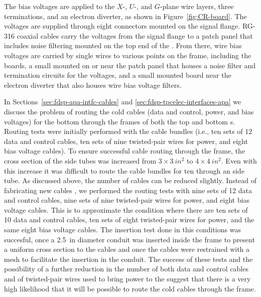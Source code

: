 The bias voltages are applied to the $X$-, $U$-, and $G$-plane 
wire layers, three  terminations, and an electron diverter, 
as shown in Figure~\ref{fig:CR-board}. The voltages are supplied 
through eight  connectors mounted on the signal flange. 
RG-316 coaxial cables carry the voltages from the signal flange to 
a patch panel  that includes noise filtering mounted on the top 
end of the . From there, wire bias voltages are carried by single wires to 
various points on the  frame, including the  
boards, a small  mounted on or near the patch panel that 
houses a noise filter and termination circuits for the   
voltages, and a small mounted board near the electron diverter 
that also houses wire bias voltage filters.

In Sections~\ref{sec:fdsp-apa-intfc-cables} and \ref{sec:fdsp-tpcelec-interfaces-apa}
we discuss the problem of routing the cold cables (data and control, power, and 
bias voltages) for the bottom  through the frames of both
the top and bottom s. Routing tests were initially performed
with the  cable bundles (i.e., ten sets of 12 data and
control cables, ten sets of nine twisted-pair wires for power, and eight bias voltage
cables). To ensure successful cable routing %
through the
 frame, the cross section of the side tubes was %
increased from %
$\num{3}\times\SI{3}{in^2}$ %
to $\num{4}\times\SI{4}{in^2}$. Even with %
this increase it was difficult to route the cable bundles for
ten  through an  side tube. As discussed
above, the number of cables can be reduced slightly. 
  Instead of
fabricating new cables , we performed the routing tests with
nine sets of 12 data and control cables, nine sets of nine 
twisted-pair wires for power, and eight bias voltage cables.
This is to approximate the condition where there are ten sets
of 10 data and control cables, ten sets of eight twisted-pair
wires for power, and the same eight bias voltage cables. The
insertion test done in this conditions was succesful, once
a \SI{2.5}{in} diameter conduit was inserted inside the 
 frame to present a uniform cross section to
the cables and once the cables were restrained with a mesh
to facilitate the insertion in the conduit. The success of
these tests and the possibility of a further reduction in the
number of both data and control cables and of twisted-pair
wires used to bring power to the  suggest
that there is a very high likelihood that it will be possible
to route the cold cables through the  frame.

